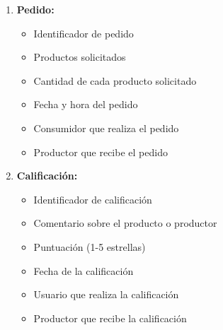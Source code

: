\begin{enumerate}[{IRQ}-1:]
    \item \textbf{Pedido:}
    \begin{itemize}
        \item Identificador de pedido
        \item Productos solicitados
        \item Cantidad de cada producto solicitado
        \item Fecha y hora del pedido
        \item Consumidor que realiza el pedido
        \item Productor que recibe el pedido
    \end{itemize}

    \item \textbf{Calificación:}
    \begin{itemize}
        \item Identificador de calificación
        \item Comentario sobre el producto o productor
        \item Puntuación (1-5 estrellas)
        \item Fecha de la calificación
        \item Usuario que realiza la calificación
        \item Productor que recibe la calificación
    \end{itemize}

\end{enumerate}